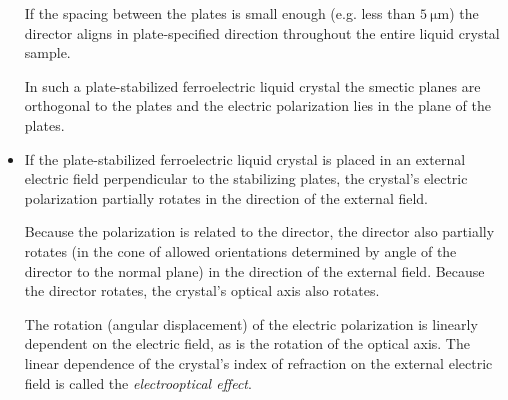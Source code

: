 \documentclass[11pt, a4paper]{article}
\begin{document}
\begin{itemize}
	If the spacing between the plates is small enough (e.g. less than $ \SI{5}{\micro \meter} $) the director aligns in plate-specified direction throughout the entire liquid crystal sample. 
	
	In such a plate-stabilized ferroelectric liquid crystal the smectic planes are orthogonal to the plates and the electric polarization lies in the plane of the plates.
	
	\item If the plate-stabilized ferroelectric liquid crystal is placed in an external electric field perpendicular to the stabilizing plates, the crystal's electric polarization partially rotates in the direction of the external field. 
	
	Because the polarization is related to the director, the director also partially rotates (in the cone of allowed orientations determined by angle of the director to the normal plane) in the direction of the external field. Because the director rotates, the crystal's optical axis also rotates.
	
	The rotation (angular displacement) of the electric polarization is linearly dependent on the electric field, as is the rotation of the optical axis. The linear dependence of the crystal's index of refraction on the external electric field is called the \textit{electrooptical effect}.
\end{itemize}
\end{document}
